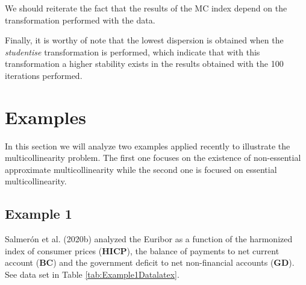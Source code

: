 We should reiterate the fact that the results of the MC index depend on the transformation performed with the data.

Finally, it is worthy of note that the lowest dispersion is obtained when the \emph{studentise} transformation is performed, which indicate that with this transformation a higher stability exists in the results obtained with the 100 iterations performed.

\hypertarget{examples}{%
\section{Examples}\label{examples}}

In this section we will analyze two examples applied recently to illustrate the multicollinearity problem. The first one focuses on the existence of non-essential approximate multicollinearity while the second one is focused on essential multicollinearity.

\hypertarget{example-1}{%
\subsection{Example 1}\label{example-1}}

Salmerón et al. (2020b) analyzed the Euribor as a function of the harmonized index of consumer prices (\textbf{HICP}), the balance of payments to net current account (\textbf{BC}) and the government deficit to net non-financial accounts (\textbf{GD}). See data set in Table \ref{tab:Example1Datalatex}.

